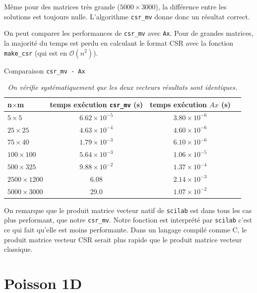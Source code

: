 \documentclass{article}
\begin{document}
Même pour des matrices très grande (\(5000\times3000\)), la différence entre les solutions est toujours nulle. L'algorithme \texttt{csr\_mv} donne donc un résultat correct.

On peut comparer les performances de \texttt{csr\_mv} avec \texttt{Ax}. Pour de grandes matrices, la majorité du temps est perdu en calculant le format CSR avec la fonction \texttt{make\_csr} (qui est en \(\mathcal{O}(n^2)\)). 

\begin{table}[H]
\caption{Comparaison \texttt{csr\_mv - Ax}}
\renewcommand*\arraystretch{1.3}
\begin{tabular}{|l|c|c|c|}
  \hline
  n\(\times\)m & temps exécution \texttt{csr\_mv} (s) & temps exécution \(Ax\) (s) \\
  \hline
	\(5 \times 5\)		&	\(6.62 \times 10^{-5}\)	&	\(3.80 \times 10^{-6}\)	\\
	\(25 \times 25\)	&	\(4.63 \times 10^{-4}\)	&	\(4.60 \times 10^{-6}\)	\\
	\(75 \times 40\)	&	\(1.79 \times 10^{-3}\)	&	\(6.10 \times 10^{-6}\)	\\
	\(100 \times 100\)	&	\(5.64 \times 10^{-3}\)	&	\(1.06 \times 10^{-5}\)	\\
	\(500 \times 325\)	&	\(9.88 \times 10^{-2}\)	&	\(1.37 \times 10^{-4}\)	\\
	\(2500 \times 1200\)&	6.08					&	\(2.14 \times 10^{-3}\)	\\
	\(5000 \times 3000\)&	29.0					&	\(1.07 \times 10^{-2}\)	\\
  \hline
\end{tabular}
\caption*{\textit{On vérifie systématiquement que les deux vecteurs résultats sont identiques.}}
\end{table}



On remarque que le produit matrice vecteur natif de \texttt{scilab} est dans tous les cas plus performant, que notre \texttt{csr\_mv}. Notre fonction est interprété par \texttt{scilab} c'est ce qui fait qu'elle est moins performante. Dans un langage compilé comme C, le produit matrice vecteur CSR serait plus rapide que le produit matrice vecteur classique.

\section{Poisson 1D}
\end{document}
